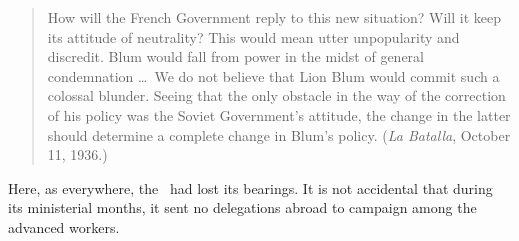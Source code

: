 \begin{quotation}
	How will the French Government reply to this new situation? Will it keep its attitude of neutrality? This would mean utter unpopularity and discredit. Blum would fall from power in the midst of general condemnation \dots\ We do not believe that Lion Blum would commit such a colossal blunder. Seeing that the only obstacle in the way of the correction of his policy was the Soviet Government’s attitude, the change in the latter should determine a complete change in Blum’s policy. (\emph{La Batalla}, October 11, 1936.)
\end{quotation}

Here, as everywhere, the \POUM\ had lost its bearings. It is not accidental that during its ministerial months, it sent no delegations abroad to campaign among the advanced workers.